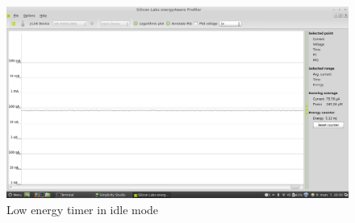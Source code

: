 \begin{figure}[H]
  \centering
  \includegraphics[clip, trim=0cm 0cm 0cm 0cm, width=12cm]{fig/LowEnergyIdle.png}
  \caption{Low energy timer in idle mode}
\end{figure}

